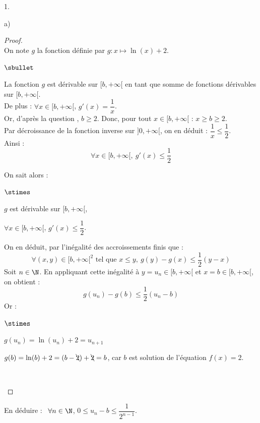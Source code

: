 \documentclass[11pt]{article}%
\begin{document}
\begin{noliste}{1.}
\begin{noliste}{a)}
    \begin{proof}~\\
      On note $g$ la fonction définie par $g :x \mapsto \ln(x)+2$.\\
      \begin{noliste}{$\sbullet$}
        \item La fonction $g$ est dérivable sur $[b,+\infty[$ en tant 
        que somme de fonctions dérivables sur $[b,+\infty[$.\\
        De plus : $\forall x \in [b,+\infty[$, $
          g'(x)= \dfrac{1}{x}$.\\
        Or, d'après la question , $b \geq 2$. Donc, pour tout 
        $x \in [b, +\infty[$ : $x \geq b \geq 2$.\\
        Par décroissance de la fonction inverse sur $]0,+\infty[$, on 
        en déduit : $\dfrac{1}{x} \leq \dfrac{1}{2}$.\\
        Ainsi :
        \[
          \forall x \in [b,+\infty[, \ g'(x) \leq \dfrac{1}{2}
        \]
        
        
        \newpage
        
        
        \item On sait alors :
        \begin{noliste}{$\stimes$}
	  \item $g$ est dérivable sur $[b,+\infty[$,
	  \item $\forall x \in [b,+\infty[$, $g'(x) \leq \dfrac{1}{2}$.
	\end{noliste}
	On en déduit, par l'inégalité des accroissements finis que :
	\[
	  \forall (x,y) \in [b,+\infty[^2 \text{ tel que } x\leq y, 
	  \ g(y) - g(x) \leq 
	  \dfrac{1}{2}(y-x)
	\]
	Soit $n\in \N$. En appliquant cette inégalité à $y = u_n \in 
	[b,+\infty[$ et $x=b \in [b,+\infty[$, on obtient :
	\[
	  g(u_n) - g(b) \leq \dfrac{1}{2} (u_n -b)
	\]
	Or :
	\begin{noliste}{$\stimes$}
	  \item $g(u_n) = \ln(u_n)+2 = u_{n+1}$
	  \item $g(b) = \ln(b)+2 = (b-\bcancel{2}) + \bcancel{2}=b$, 
	  car $b$ est solution de l'équation $f(x)=2$.
	\end{noliste}
	~\\[-1.4cm]
      \end{noliste}
    \end{proof}

    
  \item En déduire : \ $\forall n \in \N$, $0 \leq u_n-b \leq
    \dfrac{1}{2^{n-1}}$.
    

\end{noliste}
\end{noliste}
\end{document}
